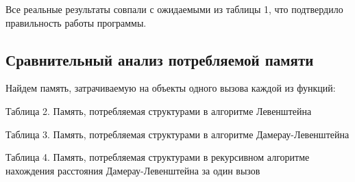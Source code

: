 \documentclass[a4paper, 14pt]{article}
\begin{document}
\begin{center}
\begin{flushleft}
        Все реальные результаты совпали с ожидаемыми из таблицы 1, что подтвердило правильность работы программы.
                
        \end{flushleft}
    \end{center}
	\subsection{Сравнительный анализ потребляемой памяти}	
	Найдем память, затрачиваемую на объекты одного вызова каждой из функций:\\
	\begin{center}
  	Таблица 2. Память, потребляемая структурами в алгоритме Левенштейна\\
	\end{center}
	
	\begin{center}
  	Таблица 3. Память, потребляемая структурами в алгоритме Дамерау-Левенштейна\\
	\end{center}
	
			\begin{center}
  	Таблица 4. Память, потребляемая структурами в рекурсивном алгоритме нахождения расстояния Дамерау-Левенштейна за один вызов\\
	\end{center}
	
\end{document}
